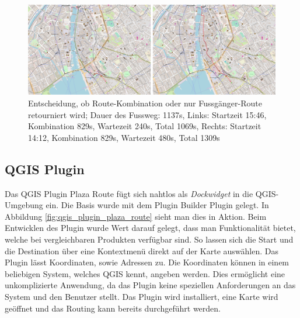 \begin{figure}[ht]
    \centering
    \includegraphics[width=1.0\linewidth]{projectdoc/img/qgis_plugin_plaza_route_walking_public_transport_comparison}
    \caption[Entscheidung, ob Route-Kombination oder nur Fussgänger-Route retourniert wird; Dauer des Fussweg: 1137s, Links: Startzeit 15:46, Kombination 829s, Wartezeit 240s, Total 1069s, Rechts: Startzeit 14:12, Kombination 829s, Wartezeit 480s, Total 1309]{Entscheidung, ob Route-Kombination oder nur Fussgänger-Route retourniert wird; Dauer des Fussweg: 1137s, Links: Startzeit 15:46, Kombination 829s, Wartezeit 240s, Total 1069s, Rechts: Startzeit 14:12, Kombination 829s, Wartezeit 480s, Total 1309s}
    \label{fig:qgis_plugin_plaza_route_walking_public_transport_comparison}
\end{figure}

\subsection{QGIS Plugin}
\label{impl:QGIS Plugin}
Das QGIS Plugin Plaza Route fügt sich nahtlos als \emph{Dockwidget} in die QGIS-Umgebung ein. Die Basis wurde mit dem Plugin Builder Plugin gelegt. In Abbildung \ref{fig:qgis_plugin_plaza_route} sieht man dies in Aktion. Beim Entwicklen des Plugin wurde Wert darauf gelegt, dass man Funktionalität bietet, welche bei vergleichbaren Produkten verfügbar sind. So lassen sich die Start und die Destination über eine Kontextmenü direkt auf der Karte auswählen. Das Plugin lässt Koordinaten, sowie Adressen zu. Die Koordinaten können in einem beliebigen System, welches QGIS kennt, angeben werden. Dies ermöglicht eine unkomplizierte Anwendung, da das Plugin keine speziellen Anforderungen an das System und den Benutzer stellt. Das Plugin wird installiert, eine Karte wird geöffnet und das Routing kann bereits durchgeführt werden.

